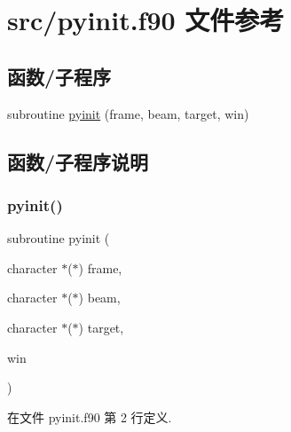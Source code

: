 \hypertarget{pyinit_8f90}{}\section{src/pyinit.f90 文件参考}
\label{pyinit_8f90}
\subsection*{函数/子程序}
\begin{DoxyCompactItemize}
\item 
subroutine \mbox{\hyperlink{pyinit_8f90_a58e87874f7a28f80dcebe403c0572f3d}{pyinit}} (frame, beam, target, win)
\end{DoxyCompactItemize}


\subsection{函数/子程序说明}
\mbox{\label{pyinit_8f90_a58e87874f7a28f80dcebe403c0572f3d}} 
\subsubsection{\texorpdfstring{pyinit()}{pyinit()}}
{\footnotesize\ttfamily subroutine pyinit (\begin{DoxyParamCaption}\item[{character $\ast$($\ast$)}]{frame,  }\item[{character $\ast$($\ast$)}]{beam,  }\item[{character $\ast$($\ast$)}]{target,  }\item[{}]{win }\end{DoxyParamCaption})}



在文件 pyinit.\+f90 第 2 行定义.

